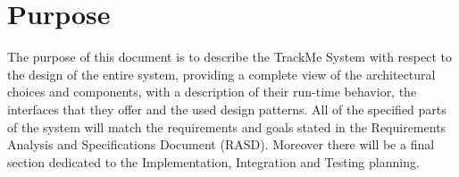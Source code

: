 \section{Purpose}
The purpose of this document is to describe the TrackMe System with respect to the design
of the entire system, providing a complete view of the architectural choices and components, with a description of their run-time behavior, the interfaces that they offer and the used design patterns. All of the specified parts of the system will match the requirements and goals stated in the Requirements Analysis and Specifications Document (RASD). Moreover there will be a final section dedicated to the Implementation, Integration and Testing planning.

